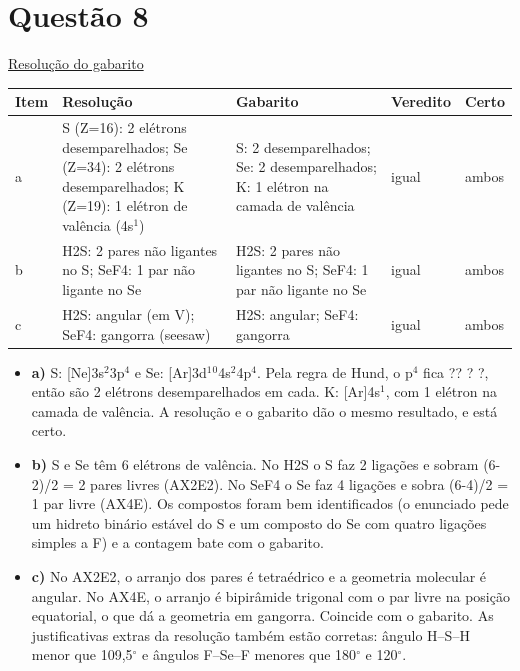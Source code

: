 \documentclass{article}%
\begin{document}
\section*{Questão 8}%
\href{https://poliedroresolve.sistemapoliedro.com.br/vestibulares/ita/2027/ita-2-fase-dia-2-21-10-2026-2-fase-dia-2/dissertativa-8-quimica-2-fase-dia-2-ita-2027}{Resolução do gabarito}\par\smallskip%
\begin{longtable}{@{}p{} p{} p{} p{} p{}@{}}\toprule Item & Resolução & Gabarito & Veredito & Certo \\ \midrule
a & S (Z=16): 2 elétrons desemparelhados; Se (Z=34): 2 elétrons desemparelhados; K (Z=19): 1 elétron de valência (4s$^{1}$) & S: 2 desemparelhados; Se: 2 desemparelhados; K: 1 elétron na camada de valência & igual & ambos \\
b & H2S: 2 pares não ligantes no S; SeF4: 1 par não ligante no Se & H2S: 2 pares não ligantes no S; SeF4: 1 par não ligante no Se & igual & ambos \\
c & H2S: angular (em V); SeF4: gangorra (seesaw) & H2S: angular; SeF4: gangorra & igual & ambos \\
\bottomrule\end{longtable}%
\begin{itemize}%
\item%
\textbf{a)} S: {[}Ne{]}3s$^2$3p$^{4}$ e Se: {[}Ar{]}3d$^{1}$$^{0}$4s$^2$4p$^{4}$. Pela regra de Hund, o p$^{4}$ fica ?? ? ?, então são 2 elétrons desemparelhados em cada. K: {[}Ar{]}4s$^{1}$, com 1 elétron na camada de valência. A resolução e o gabarito dão o mesmo resultado, e está certo.%
\item%
\textbf{b)} S e Se têm 6 elétrons de valência. No H2S o S faz 2 ligações e sobram (6-2)/2 = 2 pares livres (AX2E2). No SeF4 o Se faz 4 ligações e sobra (6-4)/2 = 1 par livre (AX4E). Os compostos foram bem identificados (o enunciado pede um hidreto binário estável do S e um composto do Se com quatro ligações simples a F) e a contagem bate com o gabarito.%
\item%
\textbf{c)} No AX2E2, o arranjo dos pares é tetraédrico e a geometria molecular é angular. No AX4E, o arranjo é bipirâmide trigonal com o par livre na posição equatorial, o que dá a geometria em gangorra. Coincide com o gabarito. As justificativas extras da resolução também estão corretas: ângulo H--S--H menor que 109,5$^\circ$ e ângulos F--Se--F menores que 180$^\circ$ e 120$^\circ$.%
\end{itemize}%
\end{document}
